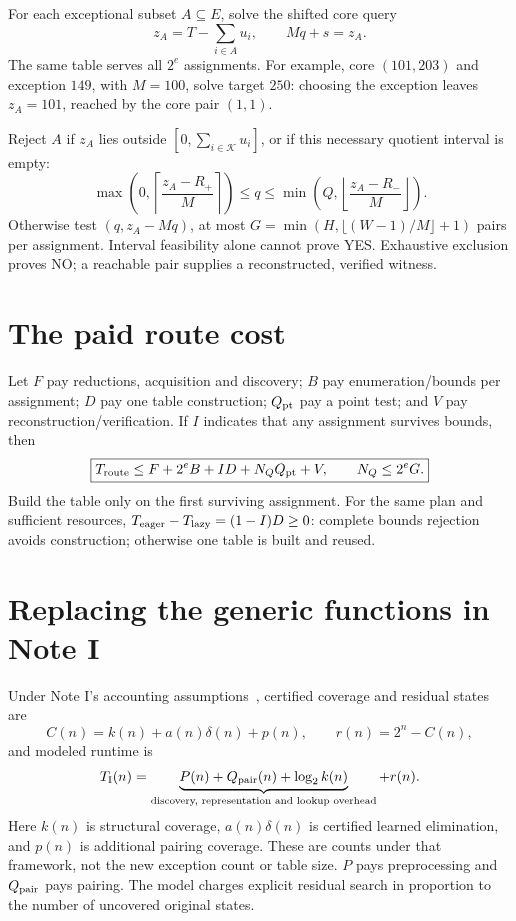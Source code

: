 \documentclass[10pt,english]{article}
\begin{document}
For each exceptional subset $A\subseteq E$, solve the shifted core query
$$
z_A=T-\sum_{i\in A}u_i,\qquad Mq+s=z_A.
$$
The same table serves all $2^e$ assignments. For example, core $(101,203)$ and exception $149$, with $M=100$, solve target $250$: choosing the exception leaves $z_A=101$, reached by the core pair $(1,1)$.

Reject $A$ if $z_A$ lies outside $[0,\sum_{i\in\mathcal K}u_i]$, or if this necessary quotient interval is empty:
$$
\max\left(0,\left\lceil\frac{z_A-R_+}{M}\right\rceil\right)
\le q\le
\min\left(Q,\left\lfloor\frac{z_A-R_-}{M}\right\rfloor\right).
$$
Otherwise test $(q,z_A-Mq)$, at most $G=\min(H,\lfloor(W-1)/M\rfloor+1)$ pairs per assignment. Interval feasibility alone cannot prove YES. Exhaustive exclusion proves NO; a reachable pair supplies a reconstructed, verified witness.

\section{The paid route cost}
Let $F$ pay reductions, acquisition and discovery; $B$ pay enumeration/bounds per assignment; $D$ pay one table construction; $Q_{\rm pt}$ pay a point test; and $V$ pay reconstruction/verification. If $I$ indicates that any assignment survives bounds, then
$$
\boxed{T_{\rm route}\le F+2^eB+ID+N_QQ_{\rm pt}+V,\qquad N_Q\le2^eG.}
$$
Build the table only on the first surviving assignment. For the same plan and sufficient resources, $T_{\rm eager}-T_{\rm lazy}=(1-I)D\ge0$: complete bounds rejection avoids construction; otherwise one table is built and reused.

\newpage
\section{Replacing the generic functions in Note I}
Under Note I's accounting assumptions~\cite{i}, certified coverage and residual states are
$$
C(n)=k(n)+a(n)\delta(n)+p(n),\qquad r(n)=2^n-C(n),
$$
and modeled runtime is
$$
T_{\rm I}(n)=\underbrace{P(n)+Q_{\rm pair}(n)+\log_2 k(n)}_{\text{discovery, representation and lookup overhead}}+r(n).
$$
Here $k(n)$ is structural coverage, $a(n)\delta(n)$ is certified learned elimination, and $p(n)$ is additional pairing coverage. These are counts under that framework, not the new exception count or table size. $P$ pays preprocessing and $Q_{\rm pair}$ pays pairing. The model charges explicit residual search in proportion to the number of uncovered original states.
\end{document}
